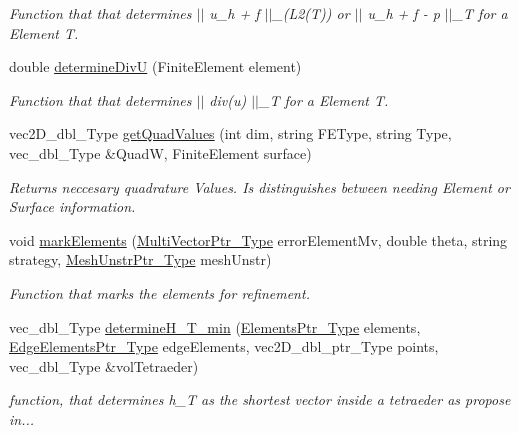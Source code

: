 \begin{DoxyCompactItemize}
\begin{DoxyCompactList}\small\item\em Function that that determines $\vert$$\vert$ u\+\_\+h + f $\vert$$\vert$\+\_\+(L2(\+T)) or $\vert$$\vert$  u\+\_\+h + f -\/  p $\vert$$\vert$\+\_\+T for a Element T. \end{DoxyCompactList}\item 
double \hyperlink{classFEDD_1_1ErrorEstimation_a2ab423f274ba3b7d8c248e57f791f42a}{determine\+DivU} (Finite\+Element element)
\begin{DoxyCompactList}\small\item\em Function that that determines $\vert$$\vert$ div(u) $\vert$$\vert$\+\_\+T for a Element T. \end{DoxyCompactList}\item 
vec2\+D\+\_\+dbl\+\_\+\+Type \hyperlink{classFEDD_1_1ErrorEstimation_ab0574f97709a57c055182e78a2bc703d}{get\+Quad\+Values} (int dim, string F\+E\+Type, string Type, vec\+\_\+dbl\+\_\+\+Type \&QuadW, Finite\+Element surface)
\begin{DoxyCompactList}\small\item\em Returns neccesary quadrature Values. Is distinguishes between needing Element or Surface information. \end{DoxyCompactList}\item 
void \hyperlink{classFEDD_1_1ErrorEstimation_ae06a1a8d7f551986e5d8bcd6a2303455}{mark\+Elements} (\hyperlink{classFEDD_1_1ErrorEstimation_a5882ff373bf8c409b407b4fd1f42bda0}{Multi\+Vector\+Ptr\+\_\+\+Type} error\+Element\+Mv, double theta, string strategy, \hyperlink{classFEDD_1_1ErrorEstimation_a862043dc355a1524640b5ef53e8eefa1}{Mesh\+Unstr\+Ptr\+\_\+\+Type} mesh\+Unstr)
\begin{DoxyCompactList}\small\item\em Function that marks the elements for refinement. \end{DoxyCompactList}\item 
vec\+\_\+dbl\+\_\+\+Type \hyperlink{classFEDD_1_1ErrorEstimation_a00677d004e3d8eda7d35958d3164ecb2}{determine\+H\+\_\+\+T\+\_\+min} (\hyperlink{classFEDD_1_1ErrorEstimation_ae8e03ce6215a8a139c1c8e9d662030ce}{Elements\+Ptr\+\_\+\+Type} elements, \hyperlink{classFEDD_1_1ErrorEstimation_ac7ab89f64446e4c6e739058240497f04}{Edge\+Elements\+Ptr\+\_\+\+Type} edge\+Elements, vec2\+D\+\_\+dbl\+\_\+ptr\+\_\+\+Type points, vec\+\_\+dbl\+\_\+\+Type \&vol\+Tetraeder)
\begin{DoxyCompactList}\small\item\em function, that determines h\+\_\+T as the shortest vector inside a tetraeder as propose in... \end{DoxyCompactList}\item 

\end{DoxyCompactItemize}
